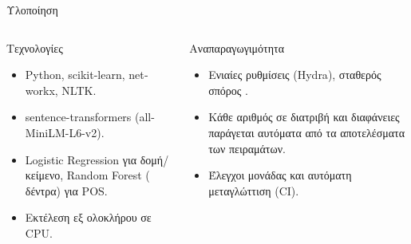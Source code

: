 \documentclass[11pt,aspectratio=169]{beamer}
\newcommand{\en}[1]{\foreignlanguage{english}{#1}}
\begin{document}

\appendix

\begin{frame}{Υλοποίηση}
  \begin{center}
  \end{center}
  \begin{columns}[T,onlytextwidth]
      \begin{block}{Τεχνολογίες}
        \footnotesize
        \begin{itemize}
          \item \en{Python}, \en{scikit-learn}, \en{networkx}, \en{NLTK}.
          \item \en{sentence-transformers} (\en{all-MiniLM-L6-v2}).
          \item \en{Logistic Regression} για δομή/κείμενο,
            \en{Random Forest} (\PosNEstimators{} δέντρα) για \en{POS}.
          \item Εκτέλεση εξ ολοκλήρου σε \en{CPU}.
        \end{itemize}
      \end{block}
      \begin{block}{Αναπαραγωγιμότητα}
        \footnotesize
        \begin{itemize}
          \item Ενιαίες ρυθμίσεις (\en{Hydra}), σταθερός σπόρος \Seed{}.
          \item Κάθε αριθμός σε διατριβή και διαφάνειες παράγεται αυτόματα
            από τα αποτελέσματα των πειραμάτων.
          \item Έλεγχοι μονάδας και αυτόματη μεταγλώττιση (\en{CI}).
        \end{itemize}
      \end{block}
  \end{columns}
\end{frame}
\end{document}
